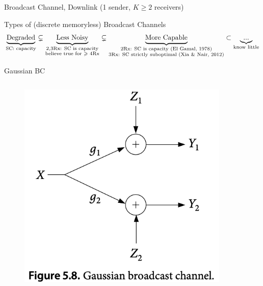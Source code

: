 \documentclass[aspectratio=43, 10pt]{beamer}
\begin{document}
\begin{frame}[t]{Broadcast Channel, Downlink \small (1 sender, $K\geq2$ receivers)}
        \vspace{-0.3em}
        \begin{block}{Types of (discrete memoryless) Broadcast Channels}
            $$\underbrace{\text{Degraded}}_{\small \text{SC: capacity}} 
            \subsetneq \underbrace{\text{Less Noisy}}_{ \substack{\text{2,3Rx: SC is capacity} \\ \text{believe true for $\geq$ 4Rx} } }
            \subsetneq \underbrace{\text{More Capable}}_{ \substack{\text{2Rx: SC is capacity (El Gamal, 1978)} \\ \text{$3$Rx: SC strictly suboptimal (Xia \& Nair, 2012)} } }
            \subset \underbrace{...}_{\text{know little}} $$
        \end{block}
    \end{frame}

    \begin{frame}{Gaussian BC}
        \vspace{-1em}
        \begin{columns}
            \begin{column}{0.25\textwidth}
                \begin{figure}
                \centering
                    \includegraphics[width=0.9\textwidth]{figures/GBC1.png}
                \end{figure}
            \end{column}
    

\end{columns}
\end{frame}
\end{document}
